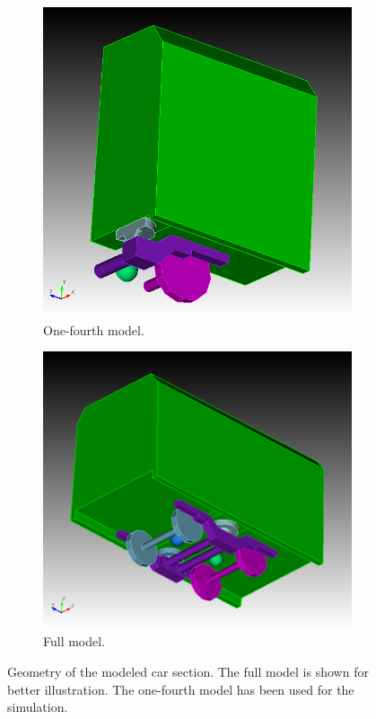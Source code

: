 \begin{figure}
	\centering
	\begin{subfigure}[b]{0.4\textwidth}
		\centering
		\includegraphics[width=0.9\linewidth]{fig/chap4/geometry/one_fourth_model.png}
		\caption{One-fourth model.}
		\label{fig:fourth_model}
	\end{subfigure}
	\hfill
	\begin{subfigure}[b]{0.4\textwidth}
		\centering
		\includegraphics[width=\linewidth]{fig/chap4/geometry/initial_model_2.png}
		\caption{Full model.}
		\label{fig:full_model}
	\end{subfigure}
	\caption{Geometry of the modeled car section. The full model is shown for better illustration. The one-fourth model has been used for the simulation.}
\end{figure}

